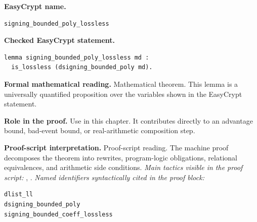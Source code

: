 \begin{formaltheorem}
\noindent\textbf{EasyCrypt name.}
\begin{lstlisting}[language=EasyCrypt,basicstyle=\ttfamily\scriptsize]
signing_bounded_poly_lossless
\end{lstlisting}
\noindent\textbf{Checked EasyCrypt statement.}
\begin{lstlisting}[language=EasyCrypt,basicstyle=\ttfamily\scriptsize]
lemma signing_bounded_poly_lossless md :
  is_lossless (dsigning_bounded_poly md).
\end{lstlisting}
\noindent\textbf{Formal mathematical reading.}
Mathematical theorem. This lemma is a universally quantified proposition over the variables shown in the EasyCrypt statement.

\noindent\textbf{Role in the proof.}
Use in this chapter. It contributes directly to an advantage bound, bad-event bound, or real-arithmetic composition step.

\noindent\textbf{Proof-script interpretation.}
Proof-script reading. The machine proof decomposes the theorem into rewrites, program-logic obligations, relational equivalences, and arithmetic side conditions.
\emph{Main tactics visible in the proof script:} , .
\emph{Named identifiers syntactically cited in the proof block:}
\begin{lstlisting}[language=EasyCrypt,basicstyle=\ttfamily\scriptsize]
dlist_ll
dsigning_bounded_poly
signing_bounded_coeff_lossless
\end{lstlisting}

\end{formaltheorem}

